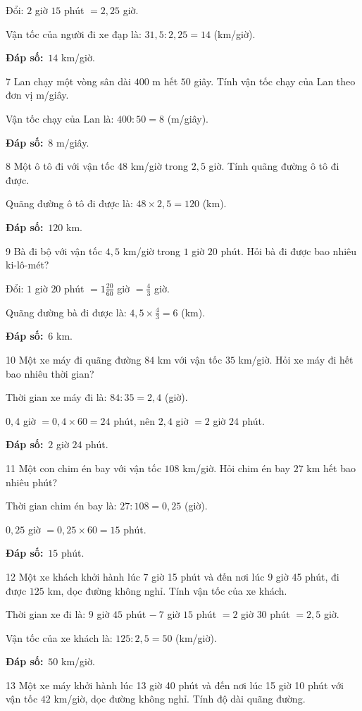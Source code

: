 \documentclass[11pt]{article}
\newif\ifsol \solfalse
\providecommand{\AnsWord}{Đáp số}
\newcommand{\dapso}[1]{\par\textbf{\AnsWord:}\ #1}
\newcommand{\probsol}[1]{%
  \begin{lrbox}{\solmeasure}\begin{minipage}{\dimexpr\linewidth-24pt\relax}#1\end{minipage}\end{lrbox}%
  \ifsol
    \begin{solbox}#1\end{solbox}%
  \else
    \setlength{\solht}{\dimexpr\ht\solmeasure+\dp\solmeasure+0.85cm\relax}%
    \ifdim\solht<1.35cm\setlength{\solht}{1.35cm}\fi
    \begin{tcolorbox}[colback=white,colframe=Line,boxrule=0.8pt,arc=5pt,
      left=8pt,right=8pt,top=4pt,bottom=4pt,height=\solht]{\footnotesize\color{Slate}\itshape\WorkWord}\end{tcolorbox}%
  \fi}
\newcommand{\gap}{\vspace{0.3cm}}
\def\WorkWord{Bài làm:}
\def\AnsWord{Đáp số}
\begin{document}
\probsol{
Đổi: $2$ giờ $15$ phút $=2{,}25$ giờ.\par
Vận tốc của người đi xe đạp là: $31{,}5:2{,}25=14$ (km/giờ).
\dapso{$14$ km/giờ.}}
\gap
\begin{probbox}{7}{\relax}
Lan chạy một vòng sân dài $400$ m hết $50$ giây. Tính vận tốc chạy của Lan theo đơn vị m/giây.
\end{probbox}
\probsol{
Vận tốc chạy của Lan là: $400:50=8$ (m/giây).
\dapso{$8$ m/giây.}}
\gap
\begin{probbox}{8}{\relax}
Một ô tô đi với vận tốc $48$ km/giờ trong $2{,}5$ giờ. Tính quãng đường ô tô đi được.
\end{probbox}
\probsol{
Quãng đường ô tô đi được là: $48\times2{,}5=120$ (km).
\dapso{$120$ km.}}
\gap
\begin{probbox}{9}{\relax}
Bà đi bộ với vận tốc $4{,}5$ km/giờ trong $1$ giờ $20$ phút. Hỏi bà đi được bao nhiêu ki-lô-mét?
\end{probbox}
\probsol{
Đổi: $1$ giờ $20$ phút $=1\frac{20}{60}$ giờ $=\frac43$ giờ.\par
Quãng đường bà đi được là: $4{,}5\times\frac43=6$ (km).
\dapso{$6$ km.}}
\gap
\begin{probbox}{10}{\relax}
Một xe máy đi quãng đường $84$ km với vận tốc $35$ km/giờ. Hỏi xe máy đi hết bao nhiêu thời gian?
\end{probbox}
\probsol{
Thời gian xe máy đi là: $84:35=2{,}4$ (giờ).\par
$0{,}4$ giờ $=0{,}4\times60=24$ phút, nên $2{,}4$ giờ $=2$ giờ $24$ phút.
\dapso{$2$ giờ $24$ phút.}}
\gap
\begin{probbox}{11}{\relax}
Một con chim én bay với vận tốc $108$ km/giờ. Hỏi chim én bay $27$ km hết bao nhiêu phút?
\end{probbox}
\probsol{
Thời gian chim én bay là: $27:108=0{,}25$ (giờ).\par
$0{,}25$ giờ $=0{,}25\times60=15$ phút.
\dapso{$15$ phút.}}
\gap
\begin{probbox}{12}{\relax}
Một xe khách khởi hành lúc 7 giờ 15 phút và đến nơi lúc 9 giờ 45 phút, đi được $125$ km, dọc đường không nghỉ. Tính vận tốc của xe khách.
\end{probbox}
\probsol{
Thời gian xe đi là: $9$ giờ $45$ phút $-\ 7$ giờ $15$ phút $=2$ giờ $30$ phút $=2{,}5$ giờ.\par
Vận tốc của xe khách là: $125:2{,}5=50$ (km/giờ).
\dapso{$50$ km/giờ.}}
\gap
\begin{probbox}{13}{\relax}
Một xe máy khởi hành lúc 13 giờ 40 phút và đến nơi lúc 15 giờ 10 phút với vận tốc $42$ km/giờ, dọc đường không nghỉ. Tính độ dài quãng đường.
\end{probbox}
\end{document}
